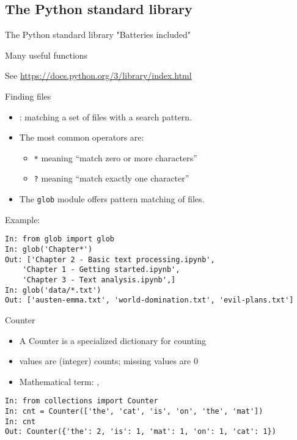 \documentclass[aspectratio=169,usenames,dvipsnames]{beamer}
\begin{document}
\subsection{The Python standard library}
\begin{frame}[fragile]{The Python standard library}
	"Batteries included"

	\vspace{1em}
	Many useful functions

	\vspace{1em}
    See \url{https://docs.python.org/3/library/index.html}
\end{frame}

\begin{frame}[fragile]{Finding files}
    \begin{itemize}
        \item {}: matching a set of files with a search pattern.
        \item The most common operators are:
            \begin{itemize}
                \item \texttt{*} meaning ``match zero or more characters''
                \item \texttt{?} meaning ``match exactly one character''
            \end{itemize}
        \item The \texttt{glob} module offers pattern matching of files.
    \end{itemize}
\pause
Example:
\begin{lstlisting}
In: from glob import glob
In: glob('Chapter*')
Out: ['Chapter 2 - Basic text processing.ipynb',
    'Chapter 1 - Getting started.ipynb',
    'Chapter 3 - Text analysis.ipynb',]
In: glob('data/*.txt')
Out: ['austen-emma.txt', 'world-domination.txt', 'evil-plans.txt']
\end{lstlisting}
\end{frame}

\begin{frame}[fragile]{Counter}
\begin{itemize}
\item A Counter is a specialized dictionary for counting
\item values are (integer) counts; missing values are 0
\item Mathematical term: , 
\end{itemize}

\begin{lstlisting}
In: from collections import Counter
In: cnt = Counter(['the', 'cat', 'is', 'on', 'the', 'mat'])
In: cnt
Out: Counter({'the': 2, 'is': 1, 'mat': 1, 'on': 1, 'cat': 1})
\end{lstlisting}
\end{frame}
\end{document}
